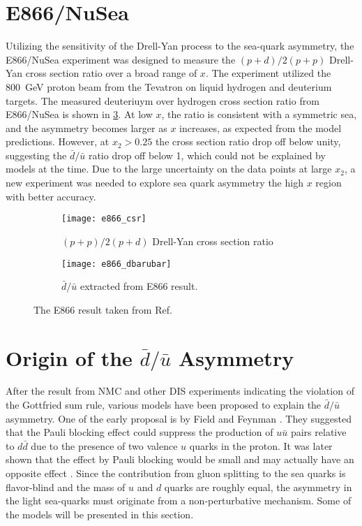 \documentclass[../main.tex]{subfiles}
\begin{document}
\section{E866/NuSea}
\label{sec:E866}
Utilizing the sensitivity of the Drell-Yan process to the sea-quark asymmetry,
the E866/NuSea experiment \cite{towell2001} was designed to measure the $(p+d)/2(p+p)$
Drell-Yan cross section ratio over a broad range of $x$. The
experiment utilized the \SI{800}{\GeV} proton beam from the Tevatron on liquid
hydrogen and deuterium targets. The measured deuteriuym over hydrogen cross section
ratio from E866/NuSea is shown in \cref{fig:e866_result}. At low $x$, the ratio is consistent
with a symmetric sea, and the asymmetry becomes larger as $x$ increases, as expected from
the model predictions. However, at $x_2>0.25$ the cross section ratio
drop off below unity, suggesting the $\bar{d}/\bar{u}$
ratio drop off below 1, which could not be explained by models at the time.
Due to the large uncertainty on the data points at large $x_2$, a new
experiment was needed to explore sea quark asymmetry the high $x$ region with better
accuracy.
\begin{figure}[htbp!]
	\centering
	\begin{subfigure}{0.45\linewidth}
		\texttt{[image: e866\_csr]}
		\caption{$(p+p)/2(p+d)$ Drell-Yan cross section ratio}
		\label{subfig:e866_csr}
	\end{subfigure}
	\begin{subfigure}{0.45\linewidth}
		\texttt{[image: e866\_dbarubar]}
		\caption{$\bar{d}/\bar{u}$ extracted from E866 result.}
		\label{subfig:e866_dbarubar}
	\end{subfigure}
	\caption{The E866 result taken from Ref.~\cite{towell2001}}
	\label{fig:e866_result}
\end{figure}

\section{Origin of the \texorpdfstring{$\bar{d}/\bar{u}$}{dbar/ubar} Asymmetry }
After the result from NMC and other DIS experiments indicating the violation of the Gottfried sum rule,
various models have been proposed to explain the $\bar{d}/\bar{u}$ asymmetry. One of the early proposal
is by Field and Feynman \cite{field1977}. They suggested that the Pauli blocking effect
could suppress the production of $u\bar{u}$ pairs relative to  $d\bar{d}$ due to the presence of two
valence $u$ quarks in the proton. It was later shown that the effect by Pauli blocking would be small and
may actually have an opposite effect \cite{steffens1997}. Since the contribution from gluon splitting to the
sea quarks is flavor-blind and the mass of $u$ and $d$ quarks are roughly equal, the asymmetry in the
light sea-quarks must originate from a non-perturbative mechanism. Some of the models will be presented
in this section.
\end{document}
